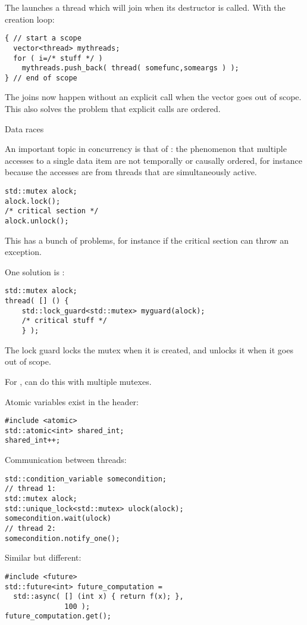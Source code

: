 The   launches a thread
which will join when its destructor is called.
With the creation loop:
\begin{lstlisting}
{ // start a scope
  vector<thread> mythreads;
  for ( i=/* stuff */ )
    mythreads.push_back( thread( somefunc,someargs ) );
} // end of scope
\end{lstlisting}
The joins now happen without an explicit call when the vector goes out of scope.
This also solves the problem that explicit  calls are ordered.

 {Data races}

An important topic in concurrency is that of
:
the phenomenon that multiple accesses to a single data item
are not temporally or causally ordered,
for instance because the accesses are from threads
that are simultaneously active.

\begin{lstlisting}
std::mutex alock;
alock.lock();
/* critical section */
alock.unlock();
\end{lstlisting}
This has a bunch of problems, for instance if the critical section can throw
an exception.

One solution is :
\begin{lstlisting}
std::mutex alock;
thread( [] () {
    std::lock_guard<std::mutex> myguard(alock);
    /* critical stuff */
    } );
\end{lstlisting}
The lock guard locks the mutex when it is created,
and unlocks it when it goes out of scope.

For , 
can do this with multiple mutexes.

Atomic variables exist in the  header:
\begin{lstlisting}
#include <atomic>  
std::atomic<int> shared_int;
shared_int++;
\end{lstlisting}

Communication between threads:
\begin{lstlisting}
std::condition_variable somecondition;
// thread 1:
std::mutex alock;
std::unique_lock<std::mutex> ulock(alock);
somecondition.wait(ulock)
// thread 2:
somecondition.notify_one();
\end{lstlisting}

Similar but different:
\begin{lstlisting}
#include <future>
std::future<int> future_computation =
  std::async( [] (int x) { return f(x); },
              100 );
future_computation.get();
\end{lstlisting}

